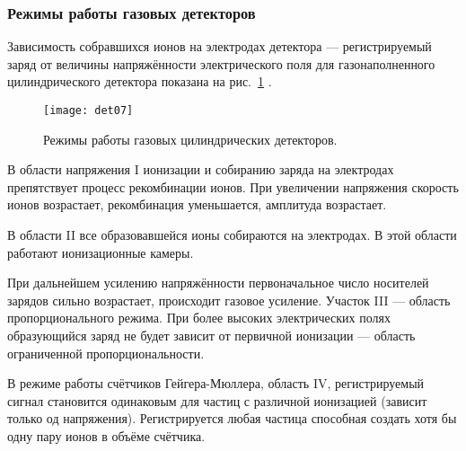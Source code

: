 \subsubsection{Режимы работы газовых детекторов}
Зависимость собравшихся ионов на электродах детектора --- регистрируемый
заряд от величины напряжённости электрического поля для газонаполненного
цилиндрического детектора показана на рис.~\ref{fig:det07} \cite{leo:94}.
\begin{figure}[h]\center
  \texttt{[image: det07]}
  \caption{Режимы работы газовых цилиндрических детекторов.}
  \label{fig:det07}
\end{figure}

В области напряжения I ионизации и собиранию заряда на электродах
препятствует процесс рекомбинации ионов. При увеличении напряжения
скорость ионов возрастает, рекомбинация уменьшается, амплитуда
возрастает.

В области II все образовавшейся ионы собираются на электродах. В этой
области работают ионизационные камеры.

При дальнейшем усилению напряжённости первоначальное число носителей
зарядов сильно возрастает, происходит газовое усиление. Участок III ---
область пропорционального режима. При более высоких электрических полях
образующийся заряд не будет зависит от первичной ионизации --- область
ограниченной пропорциональности.

В режиме работы счётчиков Гейгера-Мюллера, область IV,
регистрируемый сигнал становится одинаковым для частиц с различной
ионизацией (зависит только од напряжения). Регистрируется любая частица
способная создать хотя бы одну пару ионов в объёме счётчика.

